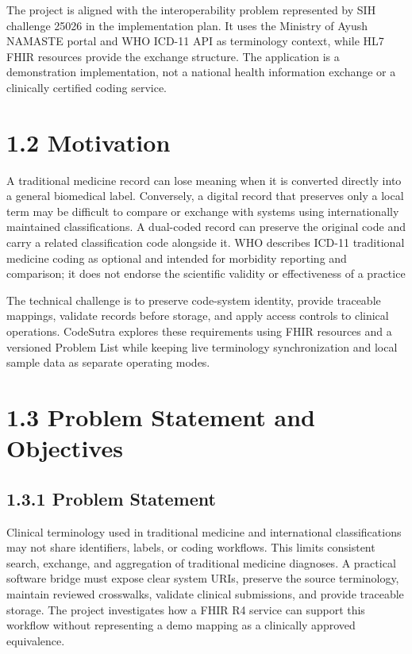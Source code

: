 \documentclass[12pt,a4paper,oneside]{report}
\begin{document}
The project is aligned with the interoperability problem represented by SIH challenge 25026 in the implementation plan. It uses the Ministry of Ayush NAMASTE portal and WHO ICD-11 API as terminology context, while HL7 FHIR resources provide the exchange structure. The application is a demonstration implementation, not a national health information exchange or a clinically certified coding service.

\section*{1.2 Motivation}
A traditional medicine record can lose meaning when it is converted directly into a general biomedical label. Conversely, a digital record that preserves only a local term may be difficult to compare or exchange with systems using internationally maintained classifications. A dual-coded record can preserve the original code and carry a related classification code alongside it. WHO describes ICD-11 traditional medicine coding as optional and intended for morbidity reporting and comparison; it does not endorse the scientific validity or effectiveness of a practice 

The technical challenge is to preserve code-system identity, provide traceable mappings, validate records before storage, and apply access controls to clinical operations. CodeSutra explores these requirements using FHIR resources and a versioned Problem List while keeping live terminology synchronization and local sample data as separate operating modes.

\section*{1.3 Problem Statement and Objectives}
\subsection*{1.3.1 Problem Statement}
Clinical terminology used in traditional medicine and international classifications may not share identifiers, labels, or coding workflows. This limits consistent search, exchange, and aggregation of traditional medicine diagnoses. A practical software bridge must expose clear system URIs, preserve the source terminology, maintain reviewed crosswalks, validate clinical submissions, and provide traceable storage. The project investigates how a FHIR R4 service can support this workflow without representing a demo mapping as a clinically approved equivalence.
\end{document}
